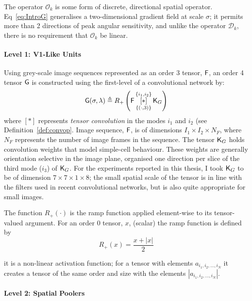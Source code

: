 The operator $\mathcal{O}_k$ is some form of discrete, directional spatial operator. Eq~\ref{eq:IntroG} generalises a two-dimensional gradient field at scale $\sigma$; it permits more than 2 directions of peak angular sensitivity, and unlike the operator $\mathcal{D}_k$, there is no requirement that $\mathcal{O}_k$ be linear.

\paragraph*{Level 1: V1-Like Units} 

Using grey-scale image sequences represented as an order 3 tensor, $\mathsf{F}$, an order 4 tensor $\mathsf{G}$ is constructed using the first-level of a convolutional network by:
\begin{equation}
\mathsf{G}(\sigma,\lambda) \triangleq R_+ \left ( \mathsf{F} \, 
   \underset{\lbrace (\cdot,3)\rbrace}{\overset{\lbrace i_1,i_2\rbrace}{[ \ast ]}}\, {\mathsf{K}_{G}} \right )
\end{equation}
where $[ \ast ]$ represents \textit{tensor convolution} in the modes $i_1$ and $i_2$ (see Definition~\ref{def:convop}. Image sequence, $\mathsf{F}$, is of dimensions $I_1\times I_2 \times N_F$, where $N_F$ represents the number of image frames in the sequence. The tensor $\mathsf{K}_{G}$ holds convolution weights that model simple-cell behaviour. These weights are generally orientation selective in the image plane, organised one direction per slice of the third mode ($i_3$) of $\mathsf{K}_{G}$. For the experiments reported in this thesis, I took $\mathsf{K}_{G}$ to be of dimension $7 \times 7 \times 1\times 8$; the small spatial scale of the tensor is in line with the filters used in recent convolutional networks, but is also quite appropriate for small images.

The function $R_+(\cdot)$ is the ramp function applied element-wise to its tensor-valued argument. For an order 0 tensor, $x$, (scalar) the ramp function is defined by
\begin{equation}
R_+(x) = \frac{x + |x|}{2}
\end{equation}

\ie it is a non-linear activation function; for a tensor with elements $a_{i_1,i_2,...,i_N}$ it creates a tensor of the same order and size with the elements $|a_{i_1,i_2,...,i_N}|$. 

\paragraph*{Level 2: Spatial Poolers} 


